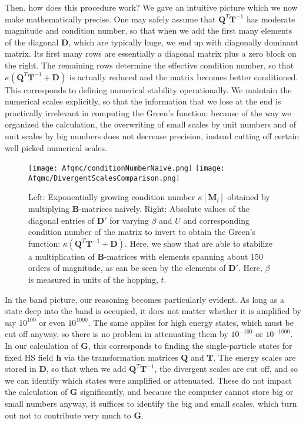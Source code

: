 Then, how does this procedure work?
We gave an intuitive picture which we now make mathematically precise.
One may safely assume that $\bm Q^T \bm T^{-1}$ has moderate magnitude and condition number, so that when we add the first many elements of the diagonal $\bm D$, which are typically huge, we end up with diagonally dominant matrix.
Its first many rows are essentially a diagonal matrix plus a zero block on the right.
The remaining rows determine the effective condition number, so that $\kappa ( \bm Q^T \bm T^{-1} + \bm D )$ is actually reduced and the matrix becomes better conditioned.
This corresponds to defining numerical stability operationally.
We maintain the numerical scales explicitly, so that the information that we lose at the end is practically irrelevant in computing the Green's function: because of the way we organized the calculation, the overwriting of small scales by unit numbers and of unit scales by big numbers does not decrease precision, instead cutting off certain well picked numerical scales.
\begin{figure}[H]\label{fig:divergences}
\hspace{0.2cm}
\texttt{[image: Afqmc/conditionNumberNaive.png]}
\texttt{[image: Afqmc/DivergentScalesComparison.png]}
\caption[Condition number of $\bm M_l = \prod_l \bm B_l$ obtained by multiplying $\bm B$-matrices naively. Absolute values of the diagonal entries of $\bm D'$ and corresponding condition number of the matrix to invert to obtain the Green's function.]{Left: Exponentially growing condition number $\kappa [ \bm M_l ]$ obtained by multiplying $\bm B$-matrices naively.
Right: Absolute values of the diagonal entries of $\bm D'$ for varying $\beta$ and $U$ and corresponding condition number of the matrix to invert to obtain the Green's function: $\kappa ( \bm Q^T \bm T^{-1} + \bm D )$.
Here, we show that are able to stabilize a multiplication of $\bm B$-matrices with elements spanning about 150 orders of magnitude, as can be seen by the elements of $\bm D'$.
Here, $\beta$ is measured in units of the hopping, $t$.}
\end{figure}

In the band picture, our reasoning becomes particularly evident.
As long as a state deep into the band is occupied, it does not matter whether it is amplified by say $10^{100}$ or even $10^{1000}$.
The same applies for high energy states, which must be cut off anyway, so there is no problem in attenuating them by $10^{-100}$ or $10^{-1000}$.
In our calculation of $\bm G$, this corresponds to finding the single-particle states for fixed HS field $\bm h$ via the transformation matrices $\bm Q$ and $\bm T$.
The energy scales are stored in $\bm D$, so that when we add $\bm Q^T \bm T^{-1}$, the divergent scales are cut off, and so we can identify which states were amplified or attenuated.
These do not impact the calculation of $\bm G$ significantly, and because the computer cannot store big or small numbers anyway, it suffices to identify the big and small scales, which turn out not to contribute very much to $\bm G$.

